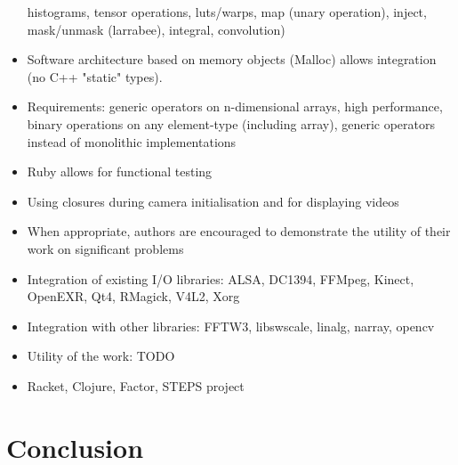 \documentclass[10pt,journal,compsoc]{joser1}
\begin{document}
\begin{footnotesize}
\begin{itemize}
    histograms, tensor operations, luts/warps, map (unary operation), inject,
    mask/unmask (larrabee), integral, convolution)
  \item Software architecture based on memory objects (Malloc) allows
    integration (no C++ "static" types).
  \item Requirements: generic operators on n-dimensional arrays, high
    performance, binary operations on any element-type (including array),
    generic operators instead of monolithic implementations
  \item Ruby allows for functional testing
  \item Using closures during camera initialisation and for displaying videos
  \item When appropriate, authors are encouraged to demonstrate the utility of
    their work on significant problems
  \item Integration of existing I/O libraries: ALSA, DC1394, FFMpeg, Kinect,
    OpenEXR, Qt4, RMagick, V4L2, Xorg
  \item Integration with other libraries: FFTW3, libswscale, linalg, narray,
    opencv
  \item Utility of the work: TODO
  \item Racket, Clojure, Factor, STEPS project
\end{itemize}
\end{footnotesize}

\section{Conclusion}
\end{document}
